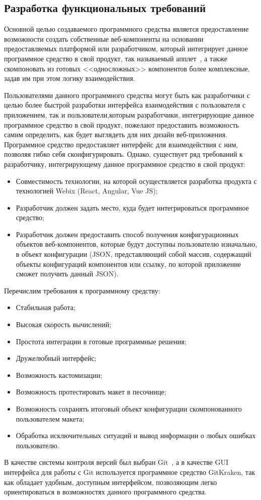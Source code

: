 \subsection{Разработка функциональных требований}
\label{sec:modeling:specification}

Основной целью создаваемого программного средства является предоставление возможности создать собственные веб-компоненты на основании предоставляемых платформой или разработчиком, который интегрирует данное программное средство в свой продукт, так называемый апплет~\cite{wiki_applet}, а также скомпоновать из готовых <<односложных>> компонентов более комплексные, задав им при этом логику взаимодействия.
 
Пользователями данного программного средства могут быть как разработчики с целью более быстрой разработки интерфейса взаимодействия с пользователя с приложением, так и пользователи,которым разработчики, интегрирующие данное программное средство в свой продукт, пожелают предоставить возможность самим определить, как будет выглядеть для них дизайн веб-приложения.
Программное средство предоставляет интерфейс для взаимодействия с ним, позволяя гибко себя сконфигурировать. Однако, существует ряд требований к разработчику, интегрирующему данное программное средство в свой продукт:

\begin{itemize}
    \item Совместимость технологии, на которой осуществляется разработка продукта с технологией Webix (React, Angular, Vue JS);
    \item Разработчик должен задать место, куда будет интегрироваться программное средство;
    \item Разработчик должен предоставить способ получения конфигурационных объектов веб-компонентов, которые будут доступны пользователю изначально, в объект конфигурации (JSON, представляющий собой массив, содержащий объекты конфигураций компонентов или ссылку, по которой приложение сможет получить данный JSON).
\end{itemize}

Перечислим требования к программному средству:

\begin{itemize}
    \item Стабильная работа;
    \item Высокая скорость вычислений;
    \item Простота интеграции в готовые программные решения;
    \item Дружелюбный интерфейс;
    \item Возможность кастомизации;
    \item Возможность протестировать макет в песочнице;
    \item Возможность сохранять итоговый объект конфигурации скомпонованного пользователем макета;
    \item Обработка исключительных ситуаций и вывод информации о любых ошибках пользователю.
\end{itemize}

В качестве системы контроля версий был выбран Git~\cite{git}, а в качестве GUI интерфейса для работы с Git используется программное средство GitKraken, так как обладает удобным, доступным интерфейсом, позволяющим легко ориентироваться в возможностях данного программного средства.
